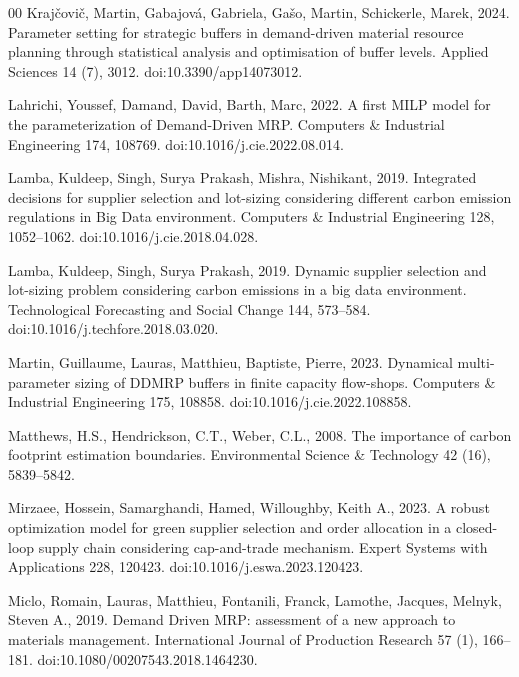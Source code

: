 \documentclass[preprint,12pt,authoryear]{elsarticle}
\begin{document}
\begin{thebibliography}{00}
Kraj{\v{c}}ovi{\v{c}}, Martin, Gabajov{\'a}, Gabriela, Ga{\v{s}}o, Martin, Schickerle, Marek, 2024.
Parameter setting for strategic buffers in demand-driven material resource planning
through statistical analysis and optimisation of buffer levels. Applied Sciences 14
(7), 3012. doi:10.3390/app14073012.

Lahrichi, Youssef, Damand, David, Barth, Marc, 2022. A first MILP model for the parameterization
of Demand-Driven MRP. Computers \& Industrial Engineering 174, 108769.
doi:10.1016/j.cie.2022.08.014.

Lamba, Kuldeep, Singh, Surya Prakash, Mishra, Nishikant, 2019. Integrated decisions for supplier selection
and lot-sizing considering different carbon emission regulations in Big Data environment.
Computers \& Industrial Engineering 128, 1052--1062. doi:10.1016/j.cie.2018.04.028.

Lamba, Kuldeep, Singh, Surya Prakash, 2019. Dynamic supplier selection and lot-sizing problem
considering carbon emissions in a big data environment. Technological Forecasting
and Social Change 144, 573--584. doi:10.1016/j.techfore.2018.03.020.

Martin, Guillaume, Lauras, Matthieu, Baptiste, Pierre, 2023. Dynamical multi-parameter sizing of
DDMRP buffers in finite capacity flow-shops. Computers \& Industrial Engineering
175, 108858. doi:10.1016/j.cie.2022.108858.

Matthews, H.S., Hendrickson, C.T., Weber, C.L., 2008. The importance of carbon
footprint estimation boundaries. Environmental Science \& Technology 42 (16),
5839--5842.

Mirzaee, Hossein, Samarghandi, Hamed, Willoughby, Keith A., 2023. A robust optimization model
for green supplier selection and order allocation in a closed-loop supply chain
considering cap-and-trade mechanism. Expert Systems with Applications 228, 120423.
doi:10.1016/j.eswa.2023.120423.

Miclo, Romain, Lauras, Matthieu, Fontanili, Franck, Lamothe, Jacques, Melnyk, Steven A., 2019. Demand Driven
MRP: assessment of a new approach to materials management. International Journal of
Production Research 57 (1), 166--181. doi:10.1080/00207543.2018.1464230.


\end{thebibliography}
\end{document}
